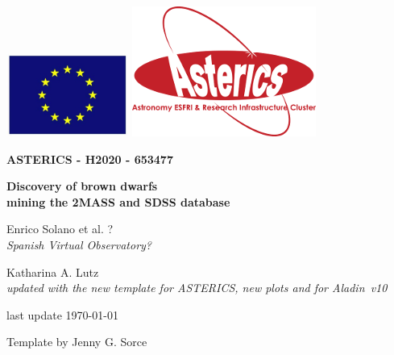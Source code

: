 \documentclass [a4paper, 12pt]{article}
\newcommand{\aladin}{{\textsc{A}{ladin}}}
\begin{document}
\begin{center}\includegraphics[width=0.3\textwidth]{../images/logo_euro.png} 
\hspace{5cm}\includegraphics[width=0.4 
\textwidth]{../images/logo_asterics.png}\\
\vspace{1.5cm}
\begin{Huge} \textbf{ASTERICS - H2020 - 653477} \end{Huge} \end{center}

 
 \vspace{1cm}
\Huge
\begin{center}
\bf Discovery of brown dwarfs \\ mining the 2MASS and SDSS database
  \end{center}

 
\vspace{1cm}
\large
\begin{center}
Enrico Solano et al. ?\\ %
\textit{Spanish Virtual Observatory?}
\end{center}
\vspace{0.5cm}
\begin{center}
Katharina A. Lutz\\
\textit{updated with the new template for ASTERICS, new plots and for \aladin\ 
v10}
\end{center}
\vspace{0.5cm}
\begin{center}
last update \today
\end{center}


\vspace{3.5cm}
Template by Jenny G. Sorce


\newpage
\normalsize
\vfill
\tableofcontents
\vfill
\end{document}
